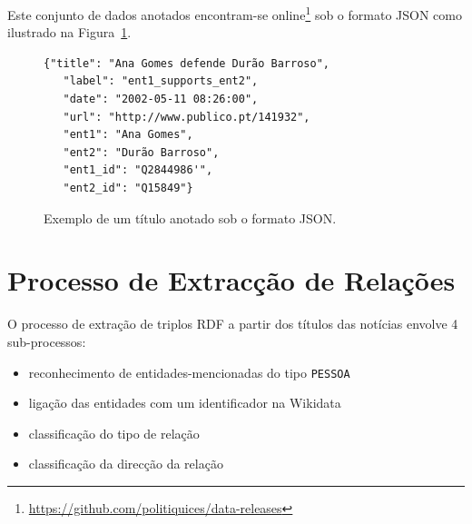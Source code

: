 \documentclass[a4paper, twocolumn, 11pt, twoside]{article}
\begin{document}

Este conjunto de dados anotados encontram-se online\footnote{\url{https://github.com/politiquices/data-releases}} sob o formato JSON como ilustrado na Figura~\ref{fig:json_sample}.

\begin{figure}[!h]
\begin{Verbatim}[fontsize=\small]
  {"title": "Ana Gomes defende Durão Barroso",
   "label": "ent1_supports_ent2",
   "date": "2002-05-11 08:26:00",
   "url": "http://www.publico.pt/141932",
   "ent1": "Ana Gomes",
   "ent2": "Durão Barroso",
   "ent1_id": "Q2844986'",
   "ent2_id": "Q15849"}
\end{Verbatim}
  \caption{Exemplo de um título anotado sob o formato JSON.}
  \label{fig:json_sample}
\end{figure}

\section{Processo de Extracção de Relações}
\label{sec:classifiers}

O processo de extração de triplos RDF a partir dos títulos das notícias envolve 4 sub-processos:

\begin{itemize}
\item reconhecimento de entidades-mencionadas do tipo \texttt{PESSOA}
\item ligação das entidades com um identificador na Wikidata
\item classificação do tipo de relação
\item classificação da direcção da relação
\end{itemize}
\end{document}
